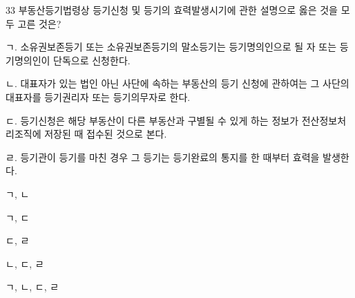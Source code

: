 \begin{question}{33}
부동산등기법령상 등기신청 및 등기의 효력발생시기에 관한 설명으로 옳은 것을 모두 고른 것은?
\begin{framedtext}
ㄱ. 소유권보존등기 또는 소유권보존등기의 말소등기는 등기명의인으로 될 자 또는 등기명의인이 단독으로 신청한다. \par
ㄴ. 대표자가 있는 법인 아닌 사단에 속하는 부동산의 등기 신청에 관하여는 그 사단의 대표자를 등기권리자 또는 등기의무자로 한다. \par
ㄷ. 등기신청은 해당 부동산이 다른 부동산과 구별될 수 있게 하는 정보가 전산정보처리조직에 저장된 때 접수된 것으로 본다. \par
ㄹ. 등기관이 등기를 마친 경우 그 등기는 등기완료의 통지를 한 때부터 효력을 발생한다. \par
\end{framedtext}
\begin{choices}
  \item ㄱ, ㄴ
  \item ㄱ, ㄷ
  \item ㄷ, ㄹ
  \item ㄴ, ㄷ, ㄹ
  \item ㄱ, ㄴ, ㄷ, ㄹ
\end{choices}
\end{question}
